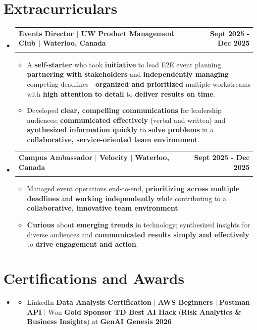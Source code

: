 \documentclass[letterpaper,10pt]{article}
\makeatletter
\newcommand{\resumeItem}[1]{
  \item\small{
    {#1 \vspace{-1pt}}
  }
}
\newcommand{\resumeSubheading}[4]{
  \vspace{-1pt}\item
    \begin{tabular*}{1.0\textwidth}[t]{l@{\extracolsep{\fill}}r}
      \textbf{#1} & \textbf{\small #2} \\
      \textit{\small#3} & \textit{\small #4} \\[-2pt]
    \end{tabular*}\vspace{-7pt}
}
\newcommand{\resumeSubHeadingListStart}{\begin{itemize}[leftmargin=0.0in, label={}]}
\newcommand{\resumeSubHeadingListEnd}{\end{itemize}}
\newcommand{\resumeItemListStart}{\begin{itemize}[leftmargin=0.15in]}
\newcommand{\resumeItemListEnd}{\end{itemize}\vspace{-4pt}}
\makeatother
\begin{document}
\section{Extracurriculars}
  \resumeSubHeadingListStart
    \resumeSubheading
      {Events Director $|$ UW Product Management Club $|$ Waterloo, Canada}{Sept 2025 - Dec 2025}
      {}{}
      \vspace{-13pt}
      \resumeItemListStart
      \vspace{-2pt}
        \resumeItem{A \textbf{self-starter} who took \textbf{initiative} to lead E2E event planning, \textbf{partnering with stakeholders} and \textbf{independently managing} competing deadlines---\textbf{organized and prioritized} multiple workstreams with \textbf{high attention to detail} to \textbf{deliver results on time}.}
        \vspace{-2pt}
        \resumeItem{Developed \textbf{clear, compelling communications} for leadership audiences; \textbf{communicated effectively} (verbal and written) and \textbf{synthesized information quickly} to \textbf{solve problems} in a \textbf{collaborative, service-oriented team environment}.}
      \resumeItemListEnd
      \vspace{-5pt}
    \resumeSubheading
      {Campus Ambassador $|$ Velocity $|$ Waterloo, Canada}{Sept 2025 - Dec 2025}
      {}{}
      \vspace{-13pt}
      \resumeItemListStart
      \vspace{-2pt}
        \resumeItem{Managed event operations end-to-end, \textbf{prioritizing across multiple deadlines} and \textbf{working independently} while contributing to a \textbf{collaborative, innovative team environment}.}
        \vspace{-2pt}
        \resumeItem{\textbf{Curious} about \textbf{emerging trends} in technology; synthesized insights for diverse audiences and \textbf{communicated results simply and effectively} to \textbf{drive engagement and action}.}
      \resumeItemListEnd
      \vspace{-2pt}
  \resumeSubHeadingListEnd
\vspace{-13pt}

\section{Certifications and Awards}
    \resumeSubHeadingListStart
      \item[]
          \resumeItemListStart
            \resumeItem{LinkedIn \textbf{Data Analysis Certification} $|$ \textbf{AWS Beginners} $|$ \textbf{Postman API} $|$ Won \textbf{Gold Sponsor TD Best AI Hack} (\textbf{Risk Analytics \& Business Insights}) at \textbf{GenAI Genesis 2026}}
          \resumeItemListEnd
          \vspace{-8pt}
   \resumeSubHeadingListEnd
\end{document}
